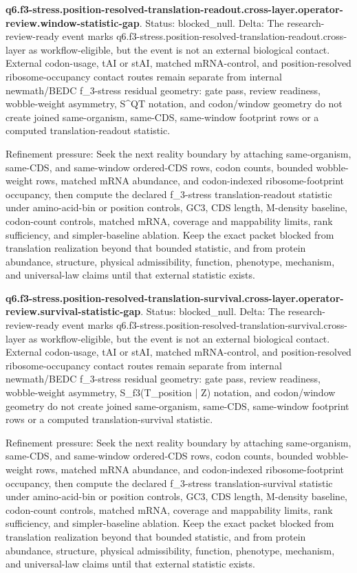 \textbf{q6.f3-stress.position-resolved-translation-readout.cross-layer.operator-review.window-statistic-gap}. Status: blocked\_null. Delta: The research-review-ready event marks q6.f3-stress.position-resolved-translation-readout.cross-layer as workflow-eligible, but the event is not an external biological contact. External codon-usage, tAI or stAI, matched mRNA-control, and position-resolved ribosome-occupancy contact routes remain separate from internal newmath/BEDC f\_3-stress residual geometry: gate pass, review readiness, wobble-weight asymmetry, S\textasciicircum{}QT notation, and codon/window geometry do not create joined same-organism, same-CDS, same-window footprint rows or a computed translation-readout statistic.

Refinement pressure: Seek the next reality boundary by attaching same-organism, same-CDS, and same-window ordered-CDS rows, codon counts, bounded wobble-weight rows, matched mRNA abundance, and codon-indexed ribosome-footprint occupancy, then compute the declared f\_3-stress translation-readout statistic under amino-acid-bin or position controls, GC3, CDS length, M-density baseline, codon-count controls, matched mRNA, coverage and mappability limits, rank sufficiency, and simpler-baseline ablation. Keep the exact packet blocked from translation realization beyond that bounded statistic, and from protein abundance, structure, physical admissibility, function, phenotype, mechanism, and universal-law claims until that external statistic exists.

\textbf{q6.f3-stress.position-resolved-translation-survival.cross-layer.operator-review.survival-statistic-gap}. Status: blocked\_null. Delta: The research-review-ready event marks q6.f3-stress.position-resolved-translation-survival.cross-layer as workflow-eligible, but the event is not an external biological contact. External codon-usage, tAI or stAI, matched mRNA-control, and position-resolved ribosome-occupancy contact routes remain separate from internal newmath/BEDC f\_3-stress residual geometry: gate pass, review readiness, wobble-weight asymmetry, S\_f3(T\_position | Z) notation, and codon/window geometry do not create joined same-organism, same-CDS, same-window footprint rows or a computed translation-survival statistic.

Refinement pressure: Seek the next reality boundary by attaching same-organism, same-CDS, and same-window ordered-CDS rows, codon counts, bounded wobble-weight rows, matched mRNA abundance, and codon-indexed ribosome-footprint occupancy, then compute the declared f\_3-stress translation-survival statistic under amino-acid-bin or position controls, GC3, CDS length, M-density baseline, codon-count controls, matched mRNA, coverage and mappability limits, rank sufficiency, and simpler-baseline ablation. Keep the exact packet blocked from translation realization beyond that bounded statistic, and from protein abundance, structure, physical admissibility, function, phenotype, mechanism, and universal-law claims until that external statistic exists.

